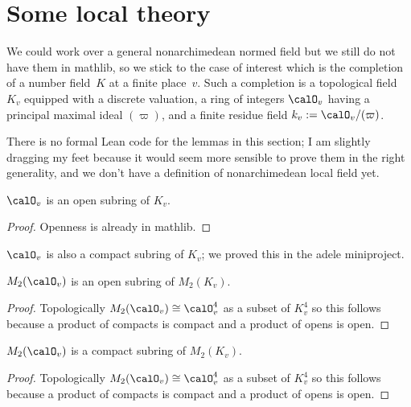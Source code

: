 \section{Some local theory}

We could work over a general nonarchimedean normed field but we still do not have them
in mathlib, so we stick to the case of interest which is the completion of a number
field~$K$ at a finite place~$v$. Such a completion is a topological field~$K_v$
equipped with a discrete valuation, a ring of integers $\calO_v$ having a principal
maximal ideal $(\varpi)$, and a finite residue field $k_v:=\calO_v/(\varpi)$.

There is no formal Lean code for the lemmas in this section; I am slightly dragging my
feet because it would seem more sensible to prove them in the right generality,
and we don't have a definition of nonarchimedean local field yet.

\begin{lemma}
  \label{NumberField.isOpenAdicCompletionIntegers}
  \leanok
  $\calO_v$ is an open subring of $K_v$.
\end{lemma}
\begin{proof}
  \leanok
  Openness is already in mathlib.
\end{proof}

$\calO_v$ is also a compact subring of $K_v$; we proved this in the adele
miniproject.

\begin{lemma} $M_2(\calO_v)$ is an open subring of $M_2(K_v)$.
  \label{M2.localFullLevel.isOpen}
  \leanok
\end{lemma}
\begin{proof}
  \leanok
  Topologically $M_2(\calO_v)\cong \calO_v^4$ as a subset of $K_v^4$ so this
  follows because a product of compacts is compact and a product of opens is open.
\end{proof}

\begin{lemma} $M_2(\calO_v)$ is a compact subring of $M_2(K_v)$.
  \label{M2.localFullLevel.isCompact}
  \leanok
\end{lemma}
\begin{proof}
  \leanok
  Topologically $M_2(\calO_v)\cong \calO_v^4$ as a subset of $K_v^4$ so this
  follows because a product of compacts is compact and a product of opens is open.
\end{proof}


